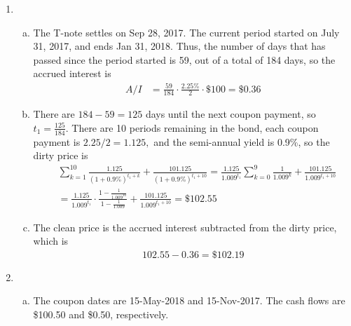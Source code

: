 \documentclass{article}
\begin{document}
\begin{enumerate}[1.]
	\item
		\begin{enumerate}[(a)]
			\item 
				\begin{soln}
					The T-note settles on Sep 28, 2017. The current period started on July 31, 2017, and ends Jan 31, 2018. Thus, the number of days that has passed since the period started is 59, out of a total of 184 days, so the accrued interest is
					\begin{align*}
						A/I &= \frac{59}{184}\cdot \frac{2.25\%}{2} \cdot \$100 = \$0.36
					\end{align*}
				\end{soln}

			\item 
				\begin{soln}
					There are $184-59=125$ days until the next coupon payment, so $t_1=\frac{125}{184}.$ There are 10 periods remaining in the bond, each coupon payment is $2.25/2=1.125,$ and the semi-annual yield is 0.9\%, so the dirty price is
					\begin{align*}
						&\sum_{k=1}^{10} \frac{1.125}{(1+0.9\%)^{t_1+k}} + \frac{101.125}{(1+0.9\%)^{t_1+10}} = \frac{1.125}{1.009^{t_1}}\sum_{k=0}^{9} \frac{1}{1.009^k} + \frac{101.125}{1.009^{t_1+10}} \\
						&= \frac{1.125}{1.009^{t_1}}\cdot \frac{1-\frac{1}{1.009^{10}}}{1-\frac{1}{1.009}} + \frac{101.125}{1.009^{t_1+10}} = \$102.55
					\end{align*}
				\end{soln}

			\item 
				\begin{soln}
					The clean price is the accrued interest subtracted from the dirty price, which is
					\begin{align*}
						102.55-0.36 = \$102.19
					\end{align*}
				\end{soln}
				
		\end{enumerate}

	\item 
		\begin{enumerate}[(a)]
			\item 
				\begin{soln}
					The coupon dates are 15-May-2018 and 15-Nov-2017. The cash flows are \$100.50 and \$0.50, respectively.
				\end{soln}


\end{enumerate}
\end{enumerate}
\end{document}
